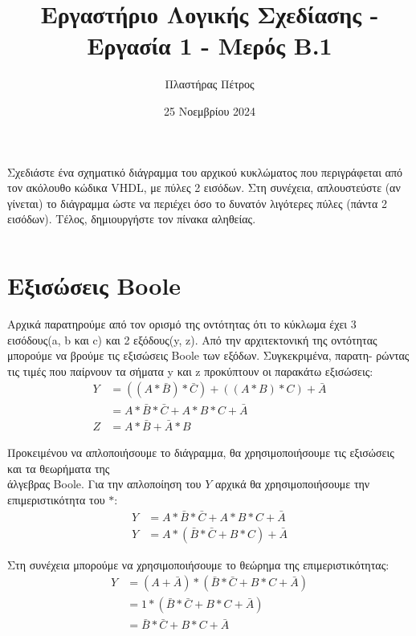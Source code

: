 \documentclass[]{article}
\begin{document}
\author{Πλαστήρας Πέτρος}
\title{Εργαστήριο Λογικής Σχεδίασης - Εργασία 1 - Μερός Β.1}
\date{25 Νοεμβρίου 2024}
\maketitle

Σχεδιάστε ένα σχηματικό διάγραμμα του αρχικού κυκλώματος που
περιγράφεται από τον ακόλουθο κώδικα VHDL, με πύλες 2 εισόδων. Στη συνέχεια,
απλουστεύστε (αν γίνεται) το διάγραμμα ώστε να περιέχει όσο το δυνατόν λιγότερες
πύλες (πάντα 2 εισόδων). Τέλος, δημιουργήστε τον πίνακα αληθείας.

\inputminted{vhdl}{./b1_prompt.vhdl}

\section{Εξισώσεις Boole}
Αρχικά παρατηρούμε από τον ορισμό της οντότητας ότι το κύκλωμα έχει 3 εισόδους(a, b και c) και 2 εξόδους(y, z).
Από την αρχιτεκτονική της οντότητας μπορούμε να βρούμε τις εξισώσεις Boole των εξόδων.
Συγκεκριμένα, παρατη- ρώντας τις τιμές που παίρνουν τα σήματα y και z προκύπτουν οι παρακάτω εξισώσεις:
\begin{align*}
	Y & = ((A * \bar{B}) * \bar{C}) + ((A * B) * C) + \bar{A} \\
	  & = A * \bar{B} * \bar{C} + A * B * C + \bar{A}         \\
	Z & = A * \bar{B} + \bar{A} * B
\end{align*}

Προκειμένου να απλοποιήσουμε το διάγραμμα, θα χρησιμοποιήσουμε τις εξισώσεις και τα θεωρήματα της\\
άλγεβρας Boole. Για την απλοποίηση του $Y$ αρχικά θα χρησιμοποιήσουμε την επιμεριστικότητα του $*$:
\begin{align*}
	Y & = A * \bar{B} * \bar{C} + A * B * C + \bar{A} \\
	Y & = A * (\bar{B} * \bar{C} + B * C) + \bar{A}
\end{align*}

Στη συνέχεια μπορούμε να χρησιμοποιήσουμε το θεώρημα της επιμεριστικότητας:
\begin{align*}
	Y & = (A + \bar{A}) * (\bar{B} * \bar{C} + B * C + \bar{A}) \\
	  & = 1 * (\bar{B} * \bar{C} + B * C + \bar{A})             \\
	  & = \bar{B} * \bar{C} + B * C + \bar{A}                   \\
\end{align*}
\end{document}
